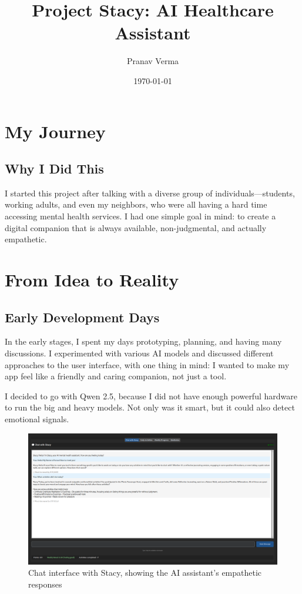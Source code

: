 \documentclass[12pt]{article}
\title{Project Stacy: AI Healthcare Assistant}
\author{Pranav Verma}
\date{\today}
\begin{document}
\maketitle
\tableofcontents
\newpage

\section{My Journey}

\subsection{Why I Did This}
I started this project after talking with a diverse group of individuals—students, working adults, and even my neighbors, who were all having a hard time accessing mental health services. I had one simple goal in mind: to create a digital companion that is always available, non-judgmental, and actually empathetic.

\section{From Idea to Reality}

\subsection{Early Development Days}
In the early stages, I spent my days prototyping, planning, and having many discussions. I experimented with various AI models and discussed different approaches to the user interface, with one thing in mind: I wanted to make my app feel like a friendly and caring companion, not just a tool.

I decided to go with Qwen 2.5, because I did not have enough powerful hardware to run the big and heavy models. Not only was it smart, but it could also detect emotional signals.

\begin{figure}[H]
  \centering
  \includegraphics[width=1\textwidth]{../images/Chat.png}
  \caption{Chat interface with Stacy, showing the AI assistant's empathetic responses}
\end{figure}
\end{document}
